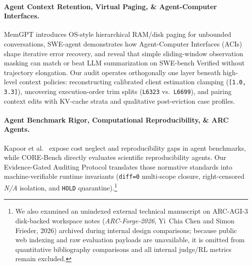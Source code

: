 \documentclass[10pt]{article}
\newcommand{\code}[1]{\texttt{#1}}
\newcommand{\na}{\textit{N/A}}
\begin{document}
\paragraph{Agent Context Retention, Virtual Paging, \& Agent-Computer Interfaces.}
MemGPT \citep{packer2023memgpt} introduces OS-style hierarchical RAM/disk paging for unbounded conversations, SWE-agent \citep{yang2024sweagent} demonstrates how Agent-Computer Interfaces (ACIs) shape iterative error recovery, and \citet{lindenbauer2025complexity} reveal that simple sliding-window observation masking can match or beat LLM summarization on SWE-bench Verified without trajectory elongation. Our audit operates orthogonally one layer beneath high-level context policies: reconstructing calibrated client estimation clamping (\code{[1.0, 3.3]}), uncovering execution-order trim splits (\code{L6323} vs.\ \code{L6699}), and pairing context edits with KV-cache strata and qualitative post-eviction case profiles.

\paragraph{Agent Benchmark Rigor, Computational Reproducibility, \& ARC Agents.}
Kapoor et al.\ \citeyearpar{kapoor2025ai} expose cost neglect and reproducibility gaps in agent benchmarks, while CORE-Bench \citep{siegel2025corebench} directly evaluates scientific reproducibility agents. Our Evidence-Gated Auditing Protocol translates those normative standards into machine-verifiable runtime invariants (\code{diff=0} multi-scope closure, right-censored \na{} isolation, and \code{HOLD} quarantine).\footnote{We also examined an unindexed external technical manuscript on ARC-AGI-3 disk-backed workspace notes (\emph{ARC-Forge-2026}, Yi~Chia Chen and Simon Frieder, 2026) archived during internal design comparisons; because public web indexing and raw evaluation payloads are unavailable, it is omitted from quantitative bibliography comparisons and all internal judge/RL metrics remain excluded.}
\end{document}
